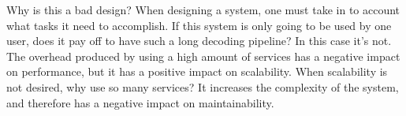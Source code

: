 \documentclass[12pt]{article}
\begin{document}
\begin{itemize}
Why is this a bad design?
When designing a system, one must take in to account what tasks it need to accomplish. If this system is only going to be used by one user, does it pay off to have such a long decoding pipeline? In this case it's not. The overhead produced by using a high amount of services has a negative impact on performance, but it has a positive impact on scalability. When scalability is not desired, why use so many services? It increases the complexity of the system, and therefore has a negative impact on maintainability.
\end{itemize}
\end{document}

